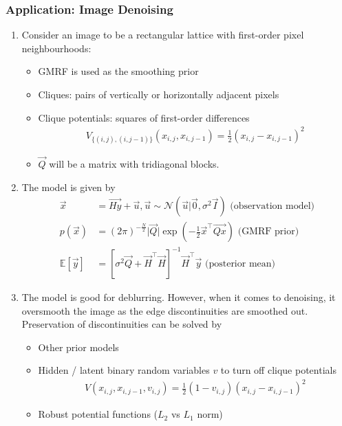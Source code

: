 \documentclass[12pt,twoside]{article}
\begin{document}
\subsubsection{Application: Image Denoising}
\begin{enumerate}
	\item Consider an image to be a rectangular lattice with first-order pixel neighbourhoods:
		\begin{itemize}
			\item GMRF is used as the smoothing prior
			\item Cliques: pairs of vertically or horizontally adjacent pixels
			\item Clique potentials: squares of first-order differences
			\begin{align*}
				V_{\lbrace (i,j), (i, j-1) \rbrace} (x_{i,j}, x_{i,j-1}) = \frac{1}{2} \left(x_{i,j} - x_{i,j-1}\right)^2
			\end{align*}
			\item $\vec{Q}$ will be a matrix with tridiagonal blocks.
		\end{itemize}

	\item The model is given by
		\begin{align*}
			\vec{x} 						& = \vec{Hy} + \vec{u}, \vec{u} \sim \mathcal{N}(\vec{u}\vert \vec{0}, \sigma^2 \vec{I}) \text{     (observation model)}	\\
			p(\vec{x})					& = (2\pi)^{-\frac{N}{2}} \vert \vec{Q}\vert \exp\left(-\frac{1}{2} \vec{x}^\top \vec{Qx} \right) \text{     (GMRF prior)}	\\
			\mathbb{E}[\vec{y}]	& = [\sigma^2\vec{Q} + \vec{H}^\top \vec{H}]^{-1} \vec{H}^\top \vec{y}\text{     (posterior mean)}
		\end{align*}

	\item The model is good for deblurring. However, when it comes to denoising, it oversmooth the image as the edge discontinuities are smoothed out. Preservation of discontinuities can be solved by
		\begin{itemize}
			\item Other prior models
			\item Hidden / latent binary random variables $v$ to turn off clique potentials
				\begin{align*}
					V(x_{i,j}, x_{i,j-1}, v_{i,j}) = \frac{1}{2}(1-v_{i,j})(x_{i,j} - x_{i,j-1})^2
				\end{align*}
			\item Robust potential functions ($L_2$ vs $L_1$ norm)
		\end{itemize}
		

\end{enumerate}
\end{document}

